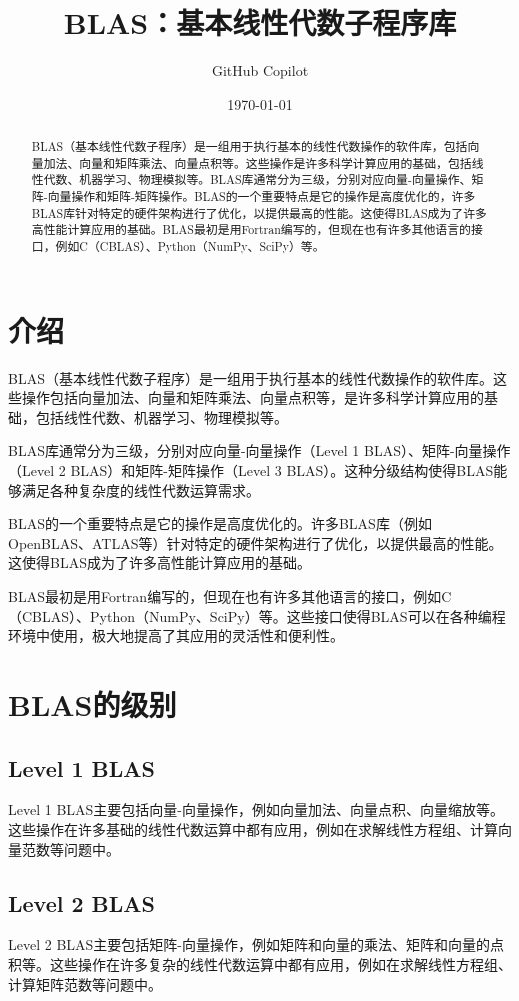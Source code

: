 \documentclass{ctexart}
\title{BLAS：基本线性代数子程序库}
\author{GitHub Copilot}
\date{\today}
\begin{document}
\maketitle

\begin{abstract}
BLAS（基本线性代数子程序）是一组用于执行基本的线性代数操作的软件库，包括向量加法、向量和矩阵乘法、向量点积等。这些操作是许多科学计算应用的基础，包括线性代数、机器学习、物理模拟等。BLAS库通常分为三级，分别对应向量-向量操作、矩阵-向量操作和矩阵-矩阵操作。BLAS的一个重要特点是它的操作是高度优化的，许多BLAS库针对特定的硬件架构进行了优化，以提供最高的性能。这使得BLAS成为了许多高性能计算应用的基础。BLAS最初是用Fortran编写的，但现在也有许多其他语言的接口，例如C（CBLAS）、Python（NumPy、SciPy）等。
\end{abstract}

\section{介绍}
BLAS（基本线性代数子程序）是一组用于执行基本的线性代数操作的软件库。这些操作包括向量加法、向量和矩阵乘法、向量点积等，是许多科学计算应用的基础，包括线性代数、机器学习、物理模拟等。

BLAS库通常分为三级，分别对应向量-向量操作（Level 1 BLAS）、矩阵-向量操作（Level 2 BLAS）和矩阵-矩阵操作（Level 3 BLAS）。这种分级结构使得BLAS能够满足各种复杂度的线性代数运算需求。

BLAS的一个重要特点是它的操作是高度优化的。许多BLAS库（例如OpenBLAS、ATLAS等）针对特定的硬件架构进行了优化，以提供最高的性能。这使得BLAS成为了许多高性能计算应用的基础。

BLAS最初是用Fortran编写的，但现在也有许多其他语言的接口，例如C（CBLAS）、Python（NumPy、SciPy）等。这些接口使得BLAS可以在各种编程环境中使用，极大地提高了其应用的灵活性和便利性。

\section{BLAS的级别}
\subsection{Level 1 BLAS}
Level 1 BLAS主要包括向量-向量操作，例如向量加法、向量点积、向量缩放等。这些操作在许多基础的线性代数运算中都有应用，例如在求解线性方程组、计算向量范数等问题中。

\subsection{Level 2 BLAS}
Level 2 BLAS主要包括矩阵-向量操作，例如矩阵和向量的乘法、矩阵和向量的点积等。这些操作在许多复杂的线性代数运算中都有应用，例如在求解线性方程组、计算矩阵范数等问题中。
\end{document}
